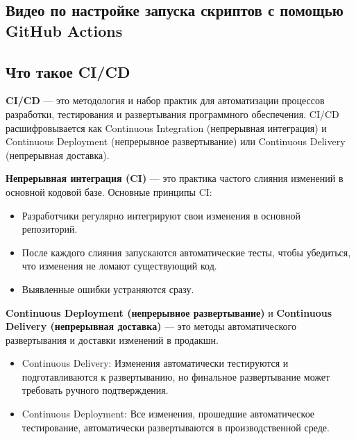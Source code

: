 \documentclass[
]{book}
\providecommand{\tightlist}{%
  \setlength{\itemsep}{0pt}\setlength{\parskip}{0pt}}
\begin{document}
\subsection{Видео по настройке запуска скриптов с помощью GitHub Actions}\label{ux432ux438ux434ux435ux43e-ux43fux43e-ux43dux430ux441ux442ux440ux43eux439ux43aux435-ux437ux430ux43fux443ux441ux43aux430-ux441ux43aux440ux438ux43fux442ux43eux432-ux441-ux43fux43eux43cux43eux449ux44cux44e-github-actions}

\subsection{Что такое CI/CD}\label{ux447ux442ux43e-ux442ux430ux43aux43eux435-cicd}

\textbf{CI/CD} --- это методология и набор практик для автоматизации процессов разработки, тестирования и развертывания программного обеспечения. CI/CD расшифровывается как Continuous Integration (непрерывная интеграция) и Continuous Deployment (непрерывное развертывание) или Continuous Delivery (непрерывная доставка).

\textbf{Непрерывная интеграция (CI)} --- это практика частого слияния изменений в основной кодовой базе. Основные принципы CI:

\begin{itemize}
\tightlist
\item
  Разработчики регулярно интегрируют свои изменения в основной репозиторий.
\item
  После каждого слияния запускаются автоматические тесты, чтобы убедиться, что изменения не ломают существующий код.
\item
  Выявленные ошибки устраняются сразу.
\end{itemize}

\textbf{Continuous Deployment (непрерывное развертывание)} и \textbf{Continuous Delivery (непрерывная доставка)} --- это методы автоматического развертывания и доставки изменений в продакшн.

\begin{itemize}
\tightlist
\item
  Continuous Delivery: Изменения автоматически тестируются и подготавливаются к развертыванию, но финальное развертывание может требовать ручного подтверждения.
\item
  Continuous Deployment: Все изменения, прошедшие автоматическое тестирование, автоматически развертываются в производственной среде.
\end{itemize}
\end{document}
